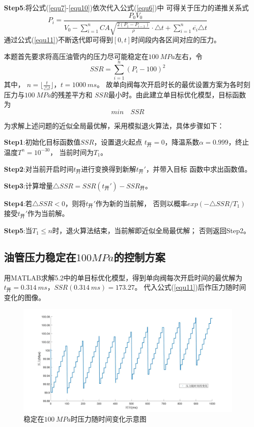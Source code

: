 \documentclass[withoutpreface,bwprint]{cumcmthesis} %
\begin{document}
    \textbf{Step5}:将公式(\ref{equ7}-\ref{equ10})依次代入公式(\ref{equ6})中
    可得关于压力的递推关系式
    \begin{equation}
        P_i=\frac{P_0V_0}
        {V_0-\sum\limits_{i=1}^n CA\sqrt{\frac{2(P_1-P_{i-1})}{\rho}}\cdot\triangle t +\sum\limits_{i=1}^n \overline{e_i}\triangle t}
    \label{equ11}
    \end{equation}
    通过公式(\ref{equ11})不断迭代即可得到$[0,t]$时间段内各区间对应的压力。

    本题首先要求将高压油管内的压力尽可能稳定在$100~MPa$左右，令
    \begin{equation}
        SSR=\sum\limits_{i=1}^n (P_i-100)^2
    \label{equ12}
    \end{equation}
    其中，
    $n=\lfloor{\frac{t}{\triangle t}}\rfloor$，$t=1000~ms$。
    故单向阀每次开启时长的最优设置方案为各时刻压力与$100~MPa$的残差平方和
    $SSR$最小时。由此建立单目标优化模型，目标函数为
    \begin{equation*}
       min \quad SSR
    \label{equ13}
    \end{equation*}

    为求解上述问题的近似全局最优解，采用模拟退火算法，具体步骤如下：

    \textbf{Step1}:初始化目标函数值$SSR$，设置退火起点
    $t_{\text{开}}=0$，降温系数$\alpha=0.999$，终止温度$T^n=10^{-30}$，
    当前时间为$T_1$。

    \textbf{Step2}:对当前开启时间$t_{\text{开}}$进行变换得到新解$t_{\text{开}}'$，并带入目标
    函数中求出函数值。

    \textbf{Step3}:计算增量$\triangle SSR=SSR(t_{\text{开}}')-SSR_{\text{开}}$。
    
    \textbf{Step4}:若$\triangle SSR<0$，则将$t_{\text{开}}'$作为新的当前解，
    否则以概率$exp(-\triangle SSR/T_1)$接受$t_{\text{开}}'$作为当前解。

    \textbf{Step5}:当$T_1 \leq n$时，退火算法结束，当前解即近似全局最优解；
    否则返回Step2。

\subsection{油管压力稳定在$100MPa$的控制方案}
    用MATLAB求解5.2中的单目标优化模型，得到单向阀每次开启时间的最优解为
    $t_{\text{开}}=0.314~ms$，$SSR(0.314~ms)=173.27$。
    代入公式(\ref{equ11})后作压力随时间变化的图像。 
    \begin{figure}[!h]
    \centering
    \includegraphics[width=.95\textwidth]{100Mpa.jpg}
    \caption{稳定在$100~MPa$时压力随时间变化示意图}
    \label{figure3}
    \end{figure}
\end{document}
